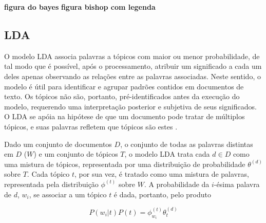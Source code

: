 


\textbf{figura do bayes}
\textbf{figura bishop com legenda}    


\subsection{LDA}
\label{subsection:LDA}

O modelo LDA associa palavras a tópicos com maior ou menor probabilidade, de tal modo que é possível, após o processamento, atribuir um significado a cada um deles apenas observando as relações entre as palavras associadas. Neste sentido, o modelo é útil para identificar e agrupar padrões contidos em documentos de texto. Os tópicos não são, portanto, pré-identificados antes da execução do modelo, requerendo uma interpretação posterior e subjetiva de seus significados. O LDA se apóia na hipótese de que um documento pode tratar de múltiplos tópicos, e suas palavras refletem que tópicos são estes \cite{pnas}. 

Dado um conjunto de documentos \ensuremath{D}, o conjunto de todas as palavras distintas em \ensuremath{D} (\ensuremath{W}) e um conjunto de tópicos \ensuremath{T}, o modelo LDA trata cada \ensuremath{d \in D} como uma mistura de tópicos, representada por uma distribuição de probabilidade \ensuremath{\theta^{(d)}} sobre \ensuremath{T}. Cada tópico \ensuremath{t}, por sua vez, é tratado como uma mistura de palavras, representada pela distribuição  \ensuremath{\phi^{(t)}} sobre \ensuremath{W}. A probabilidade da \ensuremath{i}-ésima palavra de \ensuremath{d}, \ensuremath{w_i}, se associar a um tópico \ensuremath{t} é dada, portanto, pelo produto \cite{pnas}

\begin{equation}
\label{eq2}
\ensuremath{P(w_i | t)P(t) = \phi^{(t)}_{w_i}\theta^{(d)}_{t}}
\end{equation}

